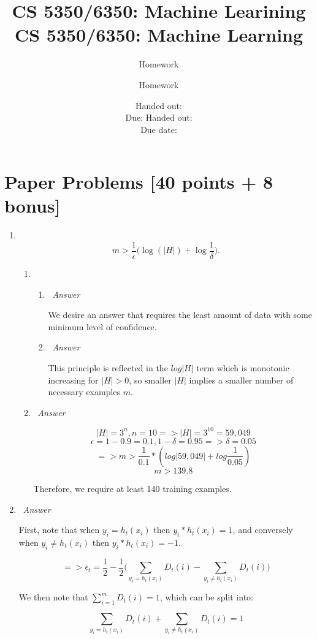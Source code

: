 \documentclass[12pt, fullpage,letterpaper]{article}
\title{CS 5350/6350: Machine Learining \semester}
\author{Homework \assignmentId}
\date{Handed out: \releaseDate\\
	Due: \dueDate}
\title{CS 5350/6350: Machine Learning \semester}
\author{Homework \assignmentId}
\date{Handed out: \releaseDate\\
  Due date: \dueDate}
\begin{document}
\maketitle



\section{Paper Problems [40 points + 8 bonus]}
\begin{enumerate}
\item~
\[
m > \frac{1}{\epsilon}\big(\log(|H|) + \log\frac{1}{\delta}\big).
\]

\begin{enumerate}
	\item~
	\begin{enumerate}
		\item~\emph{Answer}
		
		We desire an answer that requires the least amount of data with some minimum level of confidence.
		
		\item~\emph{Answer}
		
		This principle is reflected in the $log|H|$ term which is monotonic increasing for $|H|>0$, so smaller $|H|$ implies a smaller number of necessary examples $m$.
		
	\end{enumerate}
	\item~\emph{Answer}
	
	\[
        |H| = 3^{n}, n=10 => |H|=3^{10}=59,049
	\]
	\[
	    \epsilon=1-0.9=0.1, 1-\delta=0.95 => \delta=0.05
	\]
	\[
	    => m>\frac{1}{0.1}*(log|59,049|+log\frac{1}{0.05})
	\]
	\[
	    m>139.8
	\]
	
	Therefore, we require at least 140 training examples.
	
\end{enumerate}

\item~\emph{Answer}

First, note that when $y_i = h_t(x_i)$ then $y_i * h_t(x_i) = 1$, and conversely when $y_i \neq h_t(x_i)$ then $y_i * h_t(x_i) = -1$.

\[
    => \epsilon_t = \frac{1}{2} - \frac{1}{2}\big(\sum_{y_i = h_t(x_i)} D_t(i) - \sum_{y_i \neq h_t(x_i)} D_t(i)\big)
\]

We then note that $\sum_{i=1}^m D_t(i) = 1$, which can be split into: 

\[\sum_{y_i = h_t(x_i)} D_t(i) + \sum_{y_i \neq h_t(x_i)} D_t(i)=1\]


\end{enumerate}
\end{document}
